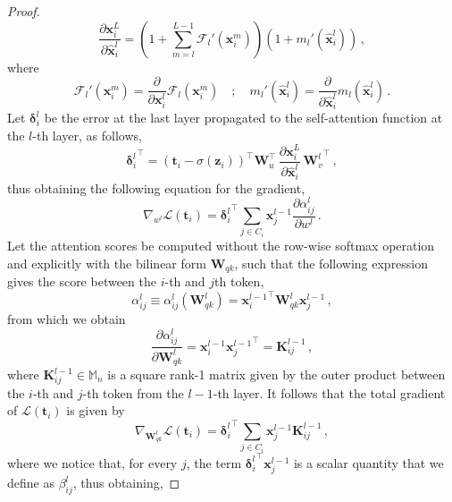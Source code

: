 \begin{proof}
%
\begin{equation}
    \frac{\partial \bm{x}_i^L}{\partial \hat{\bm{x}}_i^l} = \left(1 + \sum_{m = l}^{L-1}\mathcal{F}_l'(\bm{x}_i^m)\right) \left(1 + m_l'(\hat{\bm{x}}^l_i)\right)\,,
\end{equation}
%
where 
%
\begin{equation}
    \mathcal{F}_l'(\bm{x}_i^m) = \frac{\partial}{\partial \bm{x}_i^l}\mathcal{F}_l(\bm{x}_i^m) \quad ; \quad m_l'(\hat{\bm{x}}^l_i) = \frac{\partial}{\partial \bm{\hat{x}}_i^l} m_l(\hat{\bm{x}}^l_i) \,.
\end{equation}
%
Let $\bm{\delta}^l_i$ be the error at the last layer propagated to the self-attention function at the $l$-th layer, as follows, 
%
\begin{equation}
    {\bm{\delta}^l_i}^\top = (\bm{t}_i - \sigma(\bm{z}_i))^\top \bm{W}_u^\top \, \frac{\partial \bm{x}^L_i}{\partial \hat{\bm{x}}^l_i} \,
     {\bm{W}^l_v}^\top \,,
\end{equation}
%
thus obtaining the following equation for the gradient,
%
\begin{equation}
     \nabla_{w^l} \mathcal{L}(\bm{t}_i) = {\bm{\delta}^l_i}^\top  \sum_{j\in C_i} \bm{x}^{l-1}_j  \frac{\partial \alpha^l_{ij}}{\partial w^l} \,.
\end{equation}
%
Let the attention scores be computed without the row-wise softmax operation and explicitly with the bilinear form $\bm{W}_{qk}$, such that the following expression gives the score between the $i$-th and $j$th token,
%
\begin{equation}
    \alpha^l_{ij} \equiv \alpha^l_{ij}(\bm{W}_{qk}^l) = {\bm{x}^{l-1}_i}^\top \bm{W}_{qk}^l \bm{x}^{l-1}_j \,,
\end{equation}
%
from which we obtain
%
\begin{equation}
    \frac{\partial \alpha^l_{ij}}{\partial \bm{W}_{qk}^l} = \bm{x}^{l-1}_i{\bm{x}^{l-1}_j}^\top = \bm{K}^{l-1}_{ij}\, ,
\end{equation}
%
where $\bm{K}^{l-1}_{ij} \in \mathbb{M}_n$ is a square rank-1 matrix given by the outer product between the $i$-th and $j$-th token from the $l-1$-th layer.
%
It follows that the total gradient of $\mathcal{L}(\bm{t}_i)$ is given by
%
\begin{equation}
    \nabla_{\bm{W}_{qk}^l} \mathcal{L}(\bm{t}_i) = {\bm{\delta}^l_i}^\top \sum_{j\in C_i} \bm{x}^{l-1}_j \bm{K}^{l-1}_{ij} \,,
\end{equation}
%
where we notice that, for every $j$, the term ${\bm{\delta}^l_i}^\top \bm{x}^{l-1}_j$ is a scalar quantity that we define as $\beta^l_{ij}$, thus obtaining,

\end{proof}
